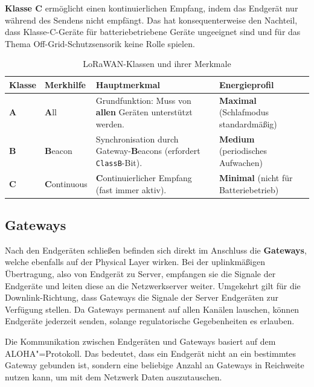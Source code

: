 \textbf{Klasse C} ermöglicht einen kontinuierlichen Empfang, indem das Endgerät nur während des Sendens nicht empfängt. 
Das hat konsequenterweise den Nachteil, dass Klasse-C-Geräte für batteriebetriebene Geräte ungeeignet sind
und für das Thema Off-Grid-Schutzsensorik keine Rolle spielen.

\begin{table}[ht]
    \centering
    \caption{LoRaWAN-Klassen und ihrer Merkmale}
    \label{tab:lorawan_mnemonics}
    \begin{tabularx}{\textwidth}{l l X X}
        \toprule
        \textbf{Klasse} & \textbf{Merkhilfe} & \textbf{Hauptmerkmal} & \textbf{Energieprofil} \\
        \midrule
        \textbf{A} & \textbf{A}ll & Grundfunktion: Muss von \textbf{allen} Geräten unterstützt werden. & \textbf{Maximal} (Schlafmodus standardmäßig) \\
        \addlinespace
        \textbf{B} & \textbf{B}eacon & Synchronisation durch Gateway-\textbf{B}eacons (erfordert \texttt{ClassB}-Bit). & \textbf{Medium} (periodisches Aufwachen) \\
        \addlinespace
        \textbf{C} & \textbf{C}ontinuous & \textbf{C}ontinuierlicher Empfang (fast immer aktiv). & \textbf{Minimal} (nicht für Batteriebetrieb) \\
        \bottomrule
    \end{tabularx}
\end{table}

\subsection{Gateways}

Nach den Endgeräten schließen befinden sich direkt im Anschluss die \textbf{Gateways}, welche ebenfalls auf der Physical Layer 
wirken. Bei der uplinkmäßigen Übertragung, also von Endgerät zu Server, empfangen sie die Signale der Endgeräte und leiten 
diese an die Netzwerkserver weiter. Umgekehrt gilt für die Downlink-Richtung, 
dass Gateways die Signale der Server Endgeräten zur Verfügung stellen. Da Gateways permanent auf allen Kanälen lauschen, 
können Endgeräte jederzeit senden, solange regulatorische Gegebenheiten es erlauben. 

Die Kommunikation zwischen Endgeräten und Gateways basiert auf dem ALOHA"=Protokoll. Das bedeutet, dass ein Endgerät nicht an 
ein bestimmtes Gateway gebunden ist, sondern eine beliebige Anzahl an Gateways in Reichweite nutzen kann, um mit dem Netzwerk 
Daten auszutauschen.

